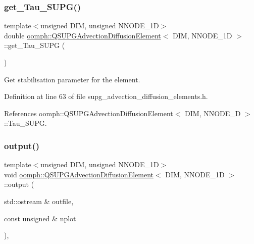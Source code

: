 \mbox{\label{classoomph_1_1QSUPGAdvectionDiffusionElement_a43b3c4aecd65d3c2f5bd710c56bf98dd}} 
\subsubsection{\texorpdfstring{get\+\_\+\+Tau\+\_\+\+S\+U\+P\+G()}{get\_Tau\_SUPG()}}
{\footnotesize\ttfamily template$<$unsigned D\+IM, unsigned N\+N\+O\+D\+E\+\_\+1D$>$ \\
double \hyperlink{classoomph_1_1QSUPGAdvectionDiffusionElement}{oomph\+::\+Q\+S\+U\+P\+G\+Advection\+Diffusion\+Element}$<$ D\+IM, N\+N\+O\+D\+E\+\_\+1D $>$\+::get\+\_\+\+Tau\+\_\+\+S\+U\+PG (\begin{DoxyParamCaption}{ }\end{DoxyParamCaption})\hspace{0.3cm}{\ttfamily [inline]}}



Get stabilisation parameter for the element. 



Definition at line 63 of file supg\+\_\+advection\+\_\+diffusion\+\_\+elements.\+h.



References oomph\+::\+Q\+S\+U\+P\+G\+Advection\+Diffusion\+Element$<$ D\+I\+M, N\+N\+O\+D\+E\+\_\+D $>$\+::\+Tau\+\_\+\+S\+U\+PG.

\mbox{\label{classoomph_1_1QSUPGAdvectionDiffusionElement_a9055a63b9b8c9f3bf606192e52413326}} 
\subsubsection{\texorpdfstring{output()}{output()}\hspace{0.1cm}{\footnotesize\ttfamily [1/4]}}
{\footnotesize\ttfamily template$<$unsigned D\+IM, unsigned N\+N\+O\+D\+E\+\_\+1D$>$ \\
void \hyperlink{classoomph_1_1QSUPGAdvectionDiffusionElement}{oomph\+::\+Q\+S\+U\+P\+G\+Advection\+Diffusion\+Element}$<$ D\+IM, N\+N\+O\+D\+E\+\_\+1D $>$\+::output (\begin{DoxyParamCaption}\item[{std\+::ostream \&}]{outfile,  }\item[{const unsigned \&}]{nplot }\end{DoxyParamCaption})\hspace{0.3cm}{\ttfamily [inline]}, {\ttfamily [virtual]}}



